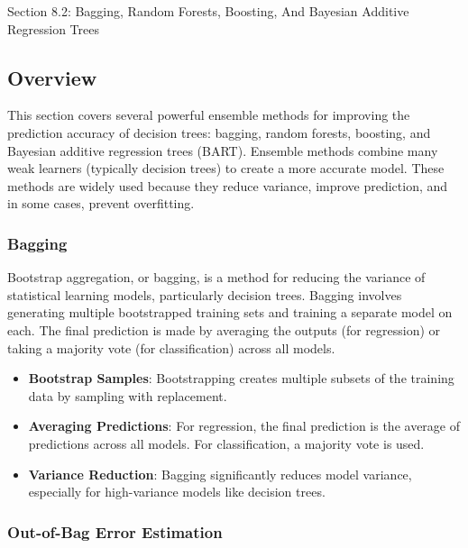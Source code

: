 \begin{notes}{Section 8.2: Bagging, Random Forests, Boosting, And Bayesian Additive Regression Trees}
    \subsection*{Overview}

    This section covers several powerful ensemble methods for improving the prediction accuracy of decision trees: bagging, random forests, boosting, and Bayesian additive regression trees (BART). 
    Ensemble methods combine many weak learners (typically decision trees) to create a more accurate model. These methods are widely used because they reduce variance, improve prediction, and in some 
    cases, prevent overfitting.
    
    \subsubsection*{Bagging}
    
    Bootstrap aggregation, or bagging, is a method for reducing the variance of statistical learning models, particularly decision trees. Bagging involves generating multiple bootstrapped training 
    sets and training a separate model on each. The final prediction is made by averaging the outputs (for regression) or taking a majority vote (for classification) across all models.
    
    \begin{highlight}
        \begin{itemize}
            \item \textbf{Bootstrap Samples}: Bootstrapping creates multiple subsets of the training data by sampling with replacement.
            \item \textbf{Averaging Predictions}: For regression, the final prediction is the average of predictions across all models. For classification, a majority vote is used.
            \item \textbf{Variance Reduction}: Bagging significantly reduces model variance, especially for high-variance models like decision trees.
        \end{itemize}
    \end{highlight}
    
    \subsubsection*{Out-of-Bag Error Estimation}
    

\end{notes}
